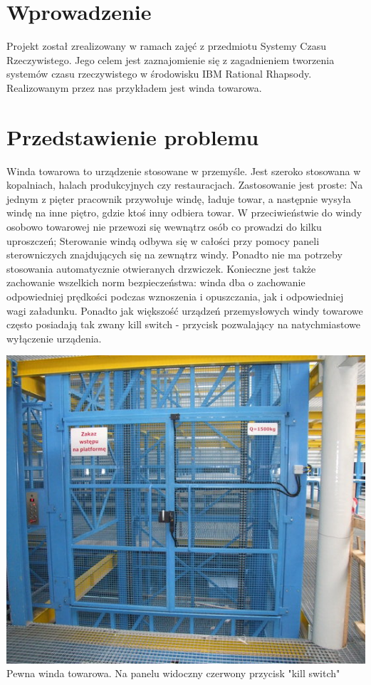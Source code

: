\documentclass[a4paper,11pt]{article}
\begin{document}
\section{Wprowadzenie}
    Projekt został zrealizowany w ramach zajęć z przedmiotu Systemy Czasu Rzeczywistego.
    Jego celem jest zaznajomienie się z zagadnieniem tworzenia systemów czasu rzeczywistego w środowisku IBM Rational Rhapsody.
    Realizowanym przez nas przykładem jest winda towarowa. 


\section{Przedstawienie problemu}

    Winda towarowa to urządzenie stosowane w przemyśle. 
    Jest szeroko stosowana w kopalniach, halach produkcyjnych czy restauracjach.
    Zastosowanie jest proste: Na jednym z pięter pracownik
    przywołuje windę, ładuje towar, a następnie wysyła windę na inne piętro, gdzie ktoś inny odbiera towar.
    W przeciwieństwie do windy osobowo towarowej nie przewozi się wewnątrz osób co prowadzi do kilku uproszczeń;
    Sterowanie windą odbywa się w całości przy pomocy paneli sterowniczych znajdujących się na zewnątrz windy. 
    Ponadto nie ma potrzeby stosowania automatycznie otwieranych drzwiczek. 
    Konieczne jest także zachowanie wszelkich norm bezpieczeństwa: winda dba o zachowanie odpowiedniej prędkości podczas wznoszenia i opuszczania,  jak i odpowiedniej wagi załadunku.
    Ponadto jak większość urządzeń przemysłowych 
    windy towarowe często posiadają tak zwany kill switch - przycisk pozwalający na natychmiastowe wyłączenie urządenia. 
   
    \begin{center} 
    	\includegraphics{images/elevator.png} \\Pewna winda towarowa. Na panelu widoczny czerwony przycisk "kill switch"\\ 
    \end{center} 
    
\end{document}
